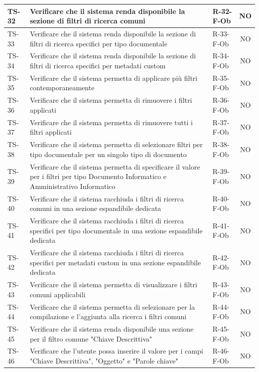 \documentclass[a4paper,12pt]{article}
\begin{document}
\begin{longtable}{|p{1.5cm}|p{8.3cm}|p{2.4cm}|c|}
\hline
TS-32 & Verificare che il sistema renda disponibile la sezione di filtri di ricerca comuni & R-32-F-Ob & NO \\
\hline
TS-33 & Verificare che il sistema renda disponibile la sezione di filtri di ricerca specifici per tipo documentale & R-33-F-Ob & NO \\
\hline
TS-34 & Verificare che il sistema renda disponibile la sezione di filtri di ricerca specifici per metadati custom & R-34-F-Ob & NO \\
\hline
TS-35 & Verificare che il sistema permetta di applicare più filtri contemporaneamente & R-35-F-Ob & NO \\
\hline
TS-36 & Verificare che il sistema permetta di rimuovere i filtri applicati & R-36-F-Ob & NO \\
\hline
TS-37 & Verificare che il sistema permetta di rimuovere tutti i filtri applicati & R-37-F-Ob & NO \\
\hline
TS-38 & Verificare che il sistema permetta di selezionare filtri per tipo documentale per un singolo tipo di documento & R-38-F-Ob & NO \\
\hline
TS-39 & Verificare che il sistema permetta di specificare il valore per i filtri per tipo Documento Informatico e Amministrativo Informatico & R-39-F-Ob & NO \\
\hline
TS-40 & Verificare che il sistema racchiuda i filtri di ricerca comuni in una sezione espandibile dedicata & R-40-F-Ob & NO \\
\hline
TS-41 & Verificare che il sistema racchiuda i filtri di ricerca specifici per tipo documentale in una sezione espandibile dedicata & R-41-F-Ob & NO \\
\hline
TS-42 & Verificare che il sistema racchiuda i filtri di ricerca specifici per metadati custom in una sezione espandibile dedicata & R-42-F-Ob & NO \\
\hline
TS-43 & Verificare che il sistema permetta di visualizzare i filtri comuni applicabili & R-43-F-Ob & NO \\
\hline
TS-44 & Verificare che il sistema permetta di selezionare per la compilazione e l'aggiunta alla ricerca i filtri comuni & R-44-F-Ob & NO \\
\hline
TS-45 & Verificare che il sistema renda disponibile una sezione per il filtro comune "Chiave Descrittiva" & R-45-F-Ob & NO \\
\hline
TS-46 & Verificare che l'utente possa inserire il valore per i campi "Chiave Descrittiva", "Oggetto" e "Parole chiave" & R-46-F-Ob & NO \\

\end{longtable}
\end{document}
